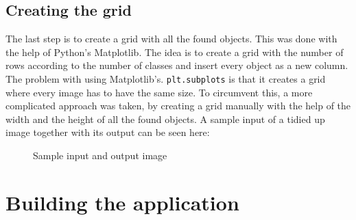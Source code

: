 \subsection{Creating the grid}

The last step is to create a grid with all the found objects. This was done with the help of Python's Matplotlib. The idea is to create a grid with the number of rows according to the number of classes and insert every object as a new column. The problem with using Matplotlib's. \texttt{plt.subplots} is that it creates a grid where every image has to have the same size. To circumvent this, a more complicated approach was taken, by creating a grid manually with the help of the width and the height of all the found objects. A sample input of a tidied up image together with its output can be seen here:

\begin{figure}[H]
    \centering
    \caption{\label{fig:sample-input-output} Sample input and output image}
\end{figure}

\section{Building the application}

